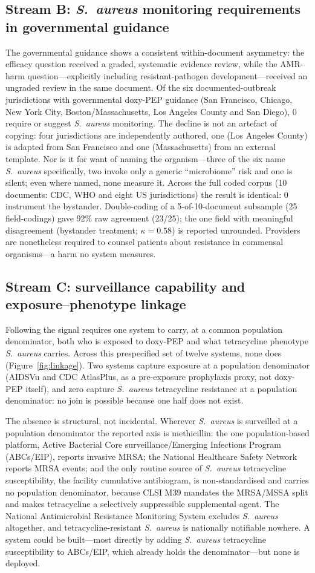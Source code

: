 \documentclass[12pt,a4paper]{article}
\newcommand{\sa}{\emph{S.~aureus}}
\begin{document}
\subsection*{Stream B: \sa{} monitoring requirements in governmental guidance}
The governmental guidance shows a consistent within-document asymmetry: the
efficacy question received a graded, systematic evidence review, while the
AMR-harm question---explicitly including resistant-pathogen development---received
an ungraded review in the same document. Of the six documented-outbreak
jurisdictions with governmental doxy-PEP guidance (San Francisco, Chicago, New
York City, Boston/Massachusetts, Los Angeles County and San Diego), 0 require or
suggest \sa{} monitoring. The decline is not an artefact of copying: four
jurisdictions are independently authored, one (Los Angeles County) is adapted
from San Francisco and one (Massachusetts) from an external template. Nor is it
for want of naming the organism---three of the six name \sa{} specifically, two
invoke only a generic ``microbiome'' risk and one is silent; even where named,
none measure it. Across the full coded corpus (10 documents: CDC, WHO and eight
US jurisdictions) the result is identical: 0 instrument the bystander.
Double-coding of a 5-of-10-document subsample (25 field-codings) gave 92\% raw
agreement (23/25); the one field with meaningful disagreement (bystander treatment;
$\kappa=0.58$) is reported unrounded. Providers are nonetheless required to counsel
patients about resistance in commensal organisms---a harm no system measures.

\subsection*{Stream C: surveillance capability and exposure--phenotype linkage}
Following the signal requires one system to carry, at a common population
denominator, both who is exposed to doxy-PEP and what tetracycline phenotype \sa{}
carries. Across this prespecified set of twelve systems, none does
(Figure~\ref{fig:linkage}). Two systems capture exposure at a population
denominator (AIDSVu and CDC AtlasPlus, as a pre-exposure prophylaxis proxy, not
doxy-PEP itself),\cite{aidsvu} and zero capture \sa{} tetracycline resistance at a
population denominator: no join is possible because one half does not exist.

The absence is structural, not incidental. Wherever \sa{} is surveilled at a population
denominator the reported axis is methicillin: the one population-based platform,
Active Bacterial Core surveillance/Emerging Infections Program (ABCs/EIP),
reports invasive MRSA; the National Healthcare Safety Network reports MRSA events;
and the only routine source of \sa{} tetracycline susceptibility, the facility
cumulative antibiogram, is non-standardised and carries no population
denominator, because CLSI M39 mandates the MRSA/MSSA split and makes tetracycline
a selectively suppressible supplemental agent. The National Antimicrobial
Resistance Monitoring System excludes \sa{} altogether, and tetracycline-resistant
\sa{} is nationally notifiable nowhere. A system could be built---most directly by
adding \sa{} tetracycline susceptibility to ABCs/EIP, which already holds the
denominator---but none is deployed.
\end{document}
